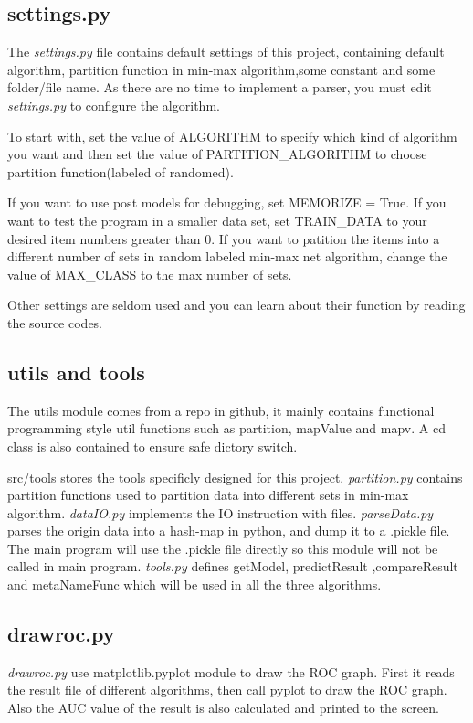 \documentclass[11pt]{article}
\begin{document}
\subsection{settings.py}
\label{sec-1-3}
The \emph{settings.py} file contains default settings of this project, containing default
algorithm, partition function in min-max algorithm,some constant and some folder/file name.
As there are no time to implement a parser, you must edit \emph{settings.py} to configure
the algorithm.

To start with, set the value of ALGORITHM
to specify which kind of algorithm you want and then set the value of PARTITION\_ALGORITHM to choose
partition function(labeled of randomed).

If you want to use post models for debugging, set MEMORIZE = True.
If you want to test the program in a smaller data set, set TRAIN\_DATA to your desired item numbers
greater than 0.
If you want to patition the items into a different number of sets in random labeled min-max net algorithm,
change the value of MAX\_CLASS to the max number of sets.

Other settings are seldom used and you can learn about their function by reading the source codes.

\subsection{utils and tools}
\label{sec-1-4}
The utils module comes from a repo in github, it mainly contains functional programming style
util functions such as partition, mapValue and mapv. A cd class is also contained to
ensure safe dictory switch.

src/tools stores the tools specificly designed for this project. \emph{partition.py} contains
partition functions used to partition data into different sets in min-max algorithm. \emph{dataIO.py}
implements the IO instruction with files. \emph{parseData.py} parses the origin data into a hash-map
in python, and dump it to a .pickle file. The main program will use the .pickle file directly
so this module will not be called in main program. \emph{tools.py} defines getModel, predictResult
,compareResult and metaNameFunc which will be used in all the three algorithms.

\subsection{drawroc.py}
\label{sec-1-5}
\emph{drawroc.py} use matplotlib.pyplot module to draw the ROC graph.
First it reads the result file of different algorithms, then call pyplot
to draw the ROC graph. Also the AUC value of the result is also calculated
and printed to the screen.
\end{document}
